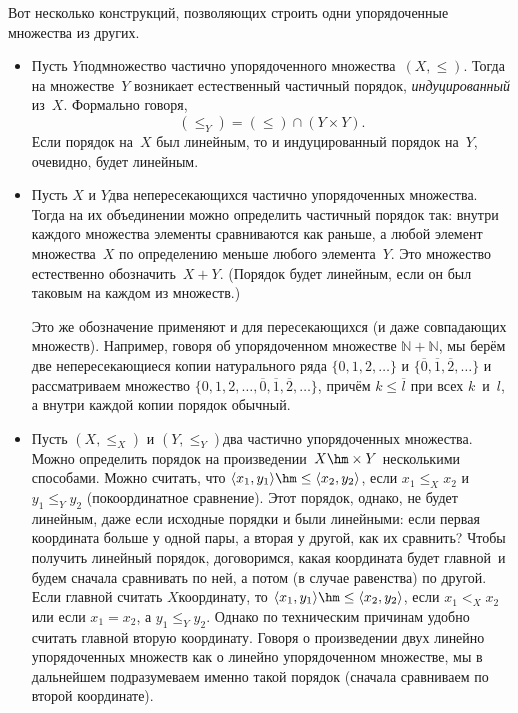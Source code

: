 Вот несколько конструкций, позволяющих строить одни упорядоченные
множества из других.

\begin{itemize}
\item
Пусть $Y$\т подмножество частично упорядоченного мно\-же\-с\-т\-ва~$(X,\le)$.
Тогда на множестве~$Y$ возникает естественный частичный порядок,
\emph{индуцированный} из~$X$. Формально говоря,
        $$
(\le _Y) = (\le) \cap (Y\times Y).
        $$
Если порядок на~$X$ был линейным, то и индуцированный порядок на~$Y$,
очевидно, будет линейным.
\item
Пусть $X$ и $Y$\т два непересекающихся частично
упорядоченных множества. Тогда на их объединении можно
определить частичный порядок так: внутри каждого множества
элементы сравниваются как раньше, а любой элемент
множества~$X$ по определению меньше любого элемента~$Y$. Это
множество естественно обозначить~$X+Y$. (Порядок будет
линейным, если он был таковым на каждом из множеств.)

Это же обозначение применяют и для пересекающихся (и даже
совпадающих множеств). Например, говоря об упорядоченном
 множестве
$\mathbb{N}+\mathbb{N}$, мы берём две
непересекающиеся копии натурального ряда $\{0,1,2,\dots\}$ и
$\{\overline 0,\overline 1,\overline 2,\dots\}$ и рассматриваем множество
$\{0,1,2,\dots,\overline 0, \overline1, \overline2,\dots\}$, причём $k\le \overline l$
при всех $k$~и~$l$, а внутри каждой копии порядок обычный.
\item
Пусть $(X, \le_{X})$ и $(Y,\le_Y)$\т два частично упорядоченных
множества. Можно определить порядок на произведении~$X\hm\times Y$ несколькими
способами. Можно считать, что $\langle x_1,y_1\rangle \hm\le
\langle x_2,y_2\rangle$, если $x_1 \le_X x_2$ и~$y_1\le_Y y_2$
(покоординатное сравнение). Этот порядок, однако, не будет
линейным, даже если исходные порядки и были линейными: если
первая координата больше у одной пары, а вторая у другой, как их
сравнить? Чтобы получить линейный
        \label{linear-cartesian-product}%
порядок, договоримся, какая координата будет  главной\ и
будем сначала сравнивать по ней, а потом (в случае равенства)\т
по другой. Если главной считать $X$\д координату, то $\langle
x_1,y_1\rangle \hm\le\langle x_2,y_2\rangle$, если $x_1 <_X x_2$
или если $x_1=x_2$, а $y_1 \le_Y y_2$. Однако по техническим
причинам удобно считать главной вторую координату. Говоря о
произведении двух линейно упорядоченных множеств как о линейно
упорядоченном множестве, мы в дальнейшем подразумеваем именно
такой порядок (сначала сравниваем по второй координате).
\end{itemize}


